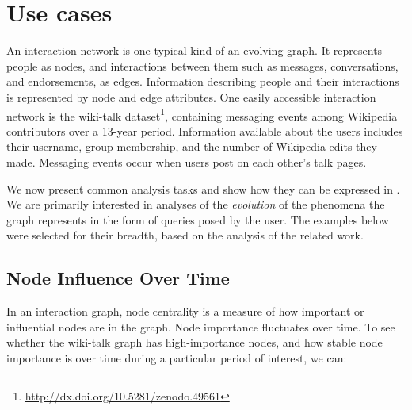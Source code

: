 \section{Use cases}
\label{sec:usecases}


An interaction network is one typical kind of an evolving graph.  It
represents people as nodes, and interactions between them such as
messages, conversations, and endorsements, as edges.  Information
describing people and their interactions is represented by node and
edge attributes.  One easily accessible interaction network is the
wiki-talk
dataset\footnote{\url{http://dx.doi.org/10.5281/zenodo.49561}},
containing messaging events among Wikipedia contributors over a
13-year period.  Information available about the users includes their
username, group membership, and the number of Wikipedia edits they
made.  Messaging events occur when users post on each other's talk
pages.

We now present common analysis tasks and show how they can be
expressed in \tga. We are primarily interested in analyses of the {\em
  evolution} of the phenomena the graph represents in the form of
queries posed by the user.  The examples below were selected for their
breadth, based on the analysis of the related work.

\subsection{Node Influence Over Time}

In an interaction graph, node centrality is a measure of how important
or influential nodes are in the graph.  Node importance
fluctuates over time.  To see whether the wiki-talk graph has
high-importance nodes, and how stable node importance is over
time during a particular period of interest, we can:

